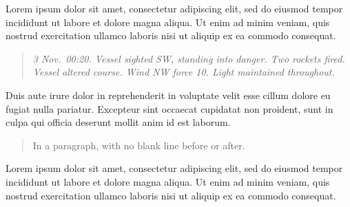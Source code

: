 \documentclass[11pt,oneside]{memoir}
\begin{document}
Lorem ipsum dolor sit amet, consectetur adipiscing elit, sed do eiusmod tempor incididunt ut labore et dolore magna aliqua. Ut enim ad minim veniam, quis nostrud exercitation ullamco laboris nisi ut aliquip ex ea commodo consequat.

\begin{quote}
\textit{3 Nov.\ 00:20. Vessel sighted SW, standing into danger. Two rockets fired. Vessel altered course. Wind NW force 10. Light maintained throughout.}
\end{quote}

Duis aute irure dolor in reprehenderit in voluptate velit esse cillum dolore eu fugiat nulla pariatur. Excepteur sint occaecat cupidatat non proident, sunt in culpa qui officia deserunt mollit anim id est laborum.
\begin{quote}
In a paragraph, with no blank line before or after.
\end{quote}
Lorem ipsum dolor sit amet, consectetur adipiscing elit, sed do eiusmod tempor incididunt ut labore et dolore magna aliqua. Ut enim ad minim veniam, quis nostrud exercitation ullamco laboris nisi ut aliquip ex ea commodo consequat.
\end{document}
